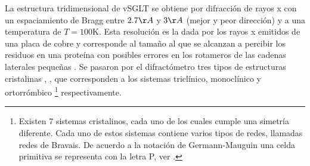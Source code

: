 La estructura tridimensional de vSGLT \cite{Faham2008} se obtiene por difracci\'{o}n de rayos x con un espaciamiento de Bragg entre $2.7\AA$ y $3\AA$ (mejor y peor direcci\'{o}n) y  a una temperatura de $T=100$K. Esta  resoluci\'{o}n es la dada por los rayos x emitidos de una placa de cobre y corresponde al tama\~{n}o al que se alcanzan a percibir los residuos en una prote\'{i}na con posibles errores en los rotameros de las cadenas laterales peque\~{n}as \cite{Huang2007}. Se pasaron por el difract\'{o}metro tres tipos de estructuras cristalinas , ,   que corresponden a los sistemas tricl\'{i}nico, monocl\'{i}nico y ortorr\'{o}mbico \footnote{Existen 7 sistemas cristalinos, cada uno de los cuales cumple una simetr\'{i}a diferente. Cada uno de estos sistemas contiene varios tipos de redes, llamadas redes de Bravais. De acuerdo a la notaci\'{o}n de Germann-Mauguin una celda primitiva se representa con la letra P, ver \cite{VainshteinModernCrystallography}.} respectivamente.\\

